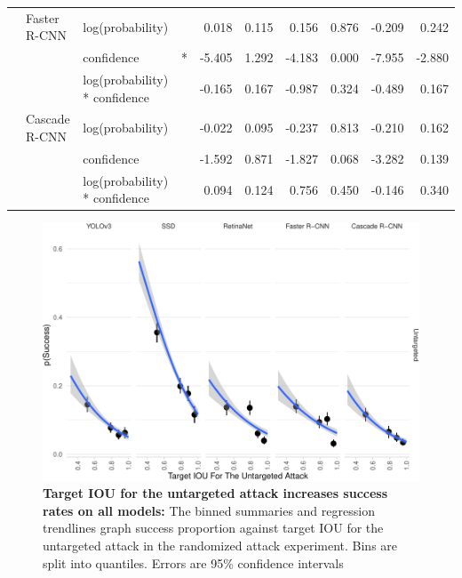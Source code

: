 \begin{longtable}[t]{llllrrrrrr}
\cmidrule{2-10}\nopagebreak
\hspace{1em} & Faster R-CNN & log(probability) &  & 0.018 & 0.115 & 0.156 & 0.876 & -0.209 & 0.242\\
\cmidrule{3-10}\nopagebreak
\hspace{1em} &  & confidence & * & -5.405 & 1.292 & -4.183 & 0.000 & -7.955 & -2.880\\
\cmidrule{3-10}\nopagebreak
\hspace{1em} &  & log(probability) * confidence &  & -0.165 & 0.167 & -0.987 & 0.324 & -0.489 & 0.167\\
\cmidrule{2-10}\nopagebreak
\hspace{1em} & Cascade R-CNN & log(probability) &  & -0.022 & 0.095 & -0.237 & 0.813 & -0.210 & 0.162\\
\cmidrule{3-10}\nopagebreak
\hspace{1em} &  & confidence &  & -1.592 & 0.871 & -1.827 & 0.068 & -3.282 & 0.139\\
\cmidrule{3-10}\nopagebreak
\hspace{1em} &  & log(probability) * confidence &  & 0.094 & 0.124 & 0.756 & 0.450 & -0.146 & 0.340\\
\bottomrule
\end{longtable}
\endgroup{}

\begin{figure}[tb]

{\centering \includegraphics{imgs/untarget_iou_graph-1} 

}

\caption{\textbf{Target IOU for the untargeted attack increases success rates on all models:}  The binned summaries and regression trendlines graph success proportion against target IOU for the untargeted attack in the randomized attack experiment. Bins are split into quantiles. Errors are 95\% confidence intervals}\label{fig:untarget_iou_graph}
\end{figure}

